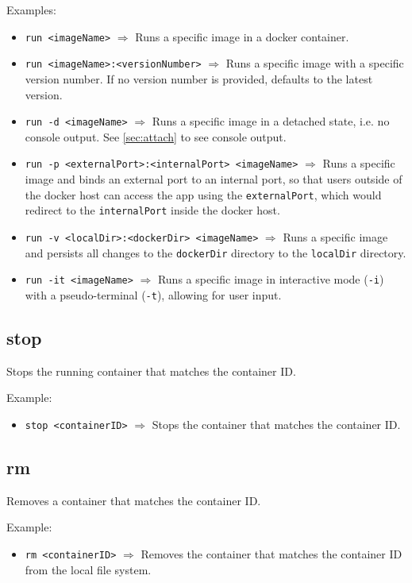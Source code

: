 \documentclass[a4paper, 12pt]{article}
\begin{document}
\vspace{0.5em}
Examples:
\begin{itemize}
	\item \texttt{run <imageName>} $\Rightarrow$ Runs a specific image
	in a docker container.
	\item \texttt{run <imageName>:<versionNumber>} $\Rightarrow$ Runs a specific
	image with a specific version number. If no version number is provided,
	defaults to the latest version.
	\item \texttt{run -d <imageName>} $\Rightarrow$ Runs a specific image in a
	detached state, i.e. no console output. See \ref{sec:attach} to see console
	output.
	\item \texttt{run -p <externalPort>:<internalPort> <imageName>}
	$\Rightarrow$ Runs a specific image and binds an external port to an
	internal port, so that users outside of the docker host can access the app
	using the \texttt{externalPort}, which would redirect to the
	\texttt{internalPort} inside the docker host.
	\item \texttt{run -v <localDir>:<dockerDir> <imageName>} $\Rightarrow$ Runs
	a specific image and persists all changes to the \texttt{dockerDir}
	directory to the \texttt{localDir} directory.
	\item \texttt{run -it <imageName>} $\Rightarrow$ Runs a specific image in
	interactive mode (\texttt{-i}) with a pseudo-terminal (\texttt{-t}),
	allowing for user input.
\end{itemize}

\subsection{stop}

Stops the running container that matches the container ID.

\vspace{0.5em}
Example:
\begin{itemize}
	\item \texttt{stop <containerID>} $\Rightarrow$ Stops the container that
	matches the container ID.
\end{itemize}

\subsection{rm}

Removes a container that matches the container ID.

\vspace{0.5em}
Example:
\begin{itemize}
	\item \texttt{rm <containerID>} $\Rightarrow$ Removes the container that
	matches the container ID from the local file system.
\end{itemize}
\end{document}
